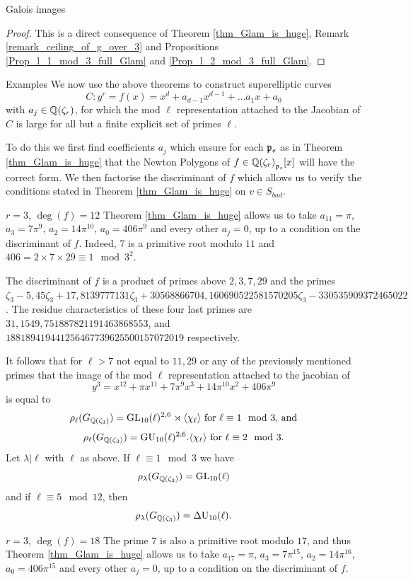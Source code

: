 \documentclass[11pt,a4paper]{article}
\newcommand{\Qr}{{\QQ(\zeta_r)}}
\newcommand{\Gcyclo}[1]{G_{\QQ(\zeta_{#1})}}
\begin{document}
\begin{section}{Galois images}
\begin{proof}
This is a direct consequence of Theorem \ref{thm_Glam_is_huge}, Remark \ref{remark_ceiling_of_g_over_3} and Propositions \ref{Prop_l_1_mod_3_full_Glam} and \ref{Prop_l_2_mod_3_full_Glam}.
\end{proof}
\begin{subsection}{Examples}
\label{subsection_examples}
We now use the above theorems to construct superelliptic curves 
\[C\colon y^r = f(x) = x^d +a_{d-1}x^{d-1} + \ldots a_1x+a_0\] with $a_j \in \Qr$, for which the mod $\ell$ representation attached to the Jacobian of $C$ is large for all but a finite explicit set of primes $\ell$.

To do this we first find coefficients $a_j$ which ensure for each $\mathfrak{p}_s$ as in Theorem \ref{thm_Glam_is_huge} that the Newton Polygons of $f \in \Qr_{\p_s}[x]$ will have the correct form.
We then factorise the discriminant of $f$ which allows us to verify the conditions stated in Theorem \ref{thm_Glam_is_huge} on $v \in S_{bad}$.
\begin{subsubsection}{$r=3$, $\deg(f) = 12$}
Theorem \ref{thm_Glam_is_huge} allows us to take $a_{11}= \pi$, $a_3=7\pi^9$, $a_2 = 14\pi^{10}$, $a_0 = 406\pi^9$ and every other $a_j=0$, up to a condition on the discriminant of $f$. Indeed, 7 is a primitive root modulo $11$ and $406 = 2 \times 7 \times 29 \equiv 1 \mod{3^2}$.

The discriminant of $f$ is a product of primes above $2,3,7,29$  and the primes $\zeta_3 - 5, 45\zeta_3 +
17, 8139777131\zeta_3 + 30568866704, 160690522581570205\zeta_3 -
330535909372465022$. The residue characteristics of these four last primes are $31, 1549, 751887821191463868553$, and \\ $188189419441256467739625500157072019$ respectively.

It follows that for $\ell>7$ not equal to $11, 29$ or any of the previously mentioned primes that the image of the mod $\ell$ representation attached to the jacobian of
\[y^3 = x^{12} + \pi x^{11} + 7\pi^{9} x^3 + 14\pi ^{10} x^2 + 406\pi^9
\]
is equal to 
\[\rho_\ell(\Gcyclo{3}) = \GL_{10}(\ell)^{2,6} \rtimes \langle \chi_\ell \rangle \text{ for $\ell \equiv 1 \mod{3}$, and}
\]
\[\rho_\ell(\Gcyclo{3}) = \GU_{10}(\ell)^{2,6} . \langle \chi_\ell \rangle \text{ for $\ell \equiv 2 \mod{3}$.}
\]
Let $\lambda|\ell$ with $\ell$ as above. If $\ell \equiv 1 \mod{3}$ we have \[\rho_\lambda(\Gcyclo{3})=\GL_{10}(\ell)\]
and if $\ell \equiv 5 \mod{12}$, then
\[\rho_\lambda(\Gcyclo{3})=\DU_{10}(\ell).\]
\end{subsubsection}
\begin{subsubsection}{$r=3$, $\deg(f) = 18$}
The prime $7$ is also a primitive root modulo $17$, and thus Theorem \ref{thm_Glam_is_huge} allows us to take $a_{17}= \pi$, $a_3=7\pi^{15}$, $a_2 = 14\pi^{16}$, $a_0 = 406\pi^{15}$ and every other $a_j=0$, up to a condition on the discriminant of $f$.


\end{subsubsection}
\end{subsection}
\end{section}
\end{document}
